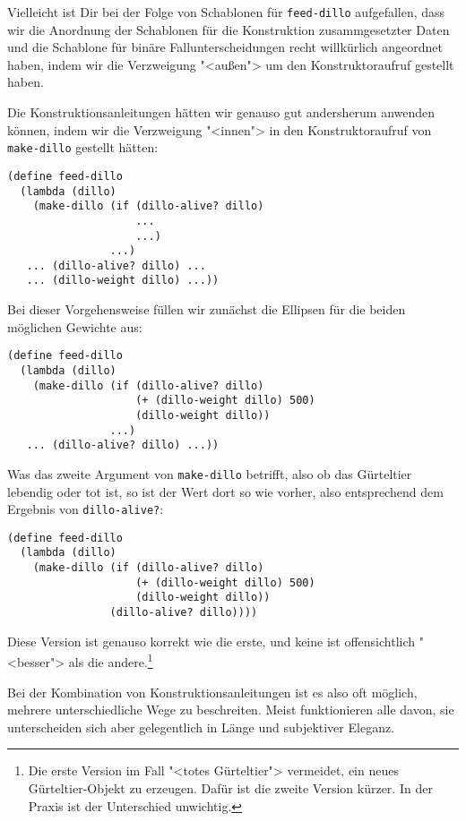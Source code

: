 Vielleicht ist Dir bei der Folge von Schablonen für
\lstinline{feed-dillo} aufgefallen, dass wir die Anordnung der Schablonen für
die Konstruktion zusammgesetzter Daten und die Schablone für binäre
Fallunterscheidungen recht willkürlich angeordnet haben, indem wir die
Verzweigung "<außen"> um den Konstruktoraufruf gestellt haben.

Die Konstruktionsanleitungen hätten wir genauso gut andersherum
anwenden können, indem wir die Verzweigung "<innen"> in den
Konstruktoraufruf von \lstinline{make-dillo} gestellt hätten:
%
\begin{lstlisting}
(define feed-dillo
  (lambda (dillo)
    (make-dillo (if (dillo-alive? dillo)
                    ...
                    ...)
                ...)
   ... (dillo-alive? dillo) ...
   ... (dillo-weight dillo) ...))
\end{lstlisting}
%
Bei dieser Vorgehensweise füllen wir zunächst die Ellipsen für die
beiden möglichen Gewichte aus:
%
\begin{lstlisting}
(define feed-dillo
  (lambda (dillo)
    (make-dillo (if (dillo-alive? dillo)
                    (+ (dillo-weight dillo) 500)
                    (dillo-weight dillo))
                ...)
   ... (dillo-alive? dillo) ...))
\end{lstlisting}
%
Was das zweite Argument von \lstinline{make-dillo} betrifft, also ob das
Gürteltier lebendig oder tot ist, so ist der Wert dort so wie
vorher, also entsprechend dem Ergebnis von \lstinline{dillo-alive?}:
%
\begin{lstlisting}
(define feed-dillo
  (lambda (dillo)
    (make-dillo (if (dillo-alive? dillo)
                    (+ (dillo-weight dillo) 500)
                    (dillo-weight dillo))
                (dillo-alive? dillo))))
\end{lstlisting}
%
Diese Version ist genauso korrekt wie die erste, und keine ist
offensichtlich "<besser"> als die andere.\footnote{Die erste Version im Fall
  "<totes Gürteltier"> vermeidet, ein neues Gürteltier-Objekt zu erzeugen.
  Dafür ist die zweite Version kürzer.  In der Praxis ist der
  Unterschied unwichtig.}

Bei der Kombination von Konstruktionsanleitungen ist es also oft
möglich, mehrere unterschiedliche Wege zu beschreiten.  Meist
funktionieren alle davon, sie unterscheiden sich aber gelegentlich in
Länge und subjektiver Eleganz.

